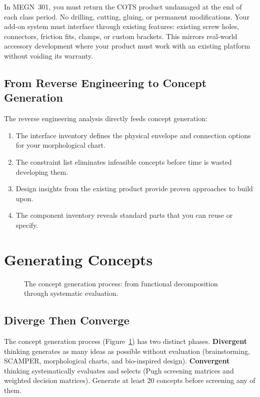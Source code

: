 \begin{tipbox}
In MEGN~301, you must return the COTS product undamaged at the end of each class period. No drilling, cutting, gluing, or permanent modifications. Your add-on system must interface through existing features: existing screw holes, connectors, friction fits, clamps, or custom brackets. This mirrors real-world accessory development where your product must work with an existing platform without voiding its warranty.
\end{tipbox}

\subsection{From Reverse Engineering to Concept Generation}
The reverse engineering analysis directly feeds concept generation:
\begin{enumerate}[nosep,leftmargin=1.5em]
\item The interface inventory defines the physical envelope and connection options for your morphological chart.
\item The constraint list eliminates infeasible concepts before time is wasted developing them.
\item Design insights from the existing product provide proven approaches to build upon.
\item The component inventory reveals standard parts that you can reuse or specify.
\end{enumerate}


\section{Generating Concepts}

\begin{figure}[htbp]\centering

\caption{The concept generation process: from functional decomposition through systematic evaluation.}\label{fig:concept_process}\end{figure}

\subsection{Diverge Then Converge}
The concept generation process (Figure~\ref{fig:concept_process}) has two distinct phases. \textbf{Divergent} thinking generates as many ideas as possible without evaluation (brainstorming, SCAMPER, morphological charts, and bio-inspired design). \textbf{Convergent} thinking systematically evaluates and selects (Pugh screening matrices and weighted decision matrices). Generate at least 20 concepts before screening any of them.

